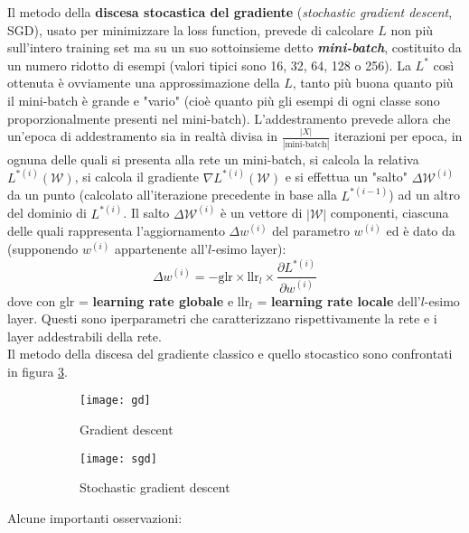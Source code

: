 Il metodo della \textbf{discesa stocastica del gradiente} (\textit{stochastic gradient descent}, SGD), usato per minimizzare la loss function, prevede di calcolare $L$ non più sull'intero training set ma su un suo sottoinsieme detto \textbf{\textit{mini-batch}}, costituito da un numero ridotto di esempi (valori tipici sono 16, 32, 64, 128 o 256). La $L^{*}$ così ottenuta è ovviamente una approssimazione della $L$, tanto più buona quanto più il mini-batch è grande e "vario" (cioè quanto più gli esempi di ogni classe sono proporzionalmente presenti nel mini-batch). L'addestramento prevede allora che un'epoca di addestramento sia in realtà divisa in $\frac{|X|}{|\text{mini-batch}|}$ iterazioni per epoca, in ognuna delle quali si presenta alla rete un mini-batch, si calcola la relativa $L^{*(i)}(\mathcal{W})$, si calcola il gradiente $\nabla L^{*(i)}(\mathcal{W})$ e si effettua un "salto" $\Delta \mathcal{W}^{(i)}$ da un punto (calcolato all'iterazione precedente in base alla $L^{*(i-1)}$) ad un altro del dominio di $L^{*(i)}$. Il salto $\Delta \mathcal{W}^{(i)}$ è un vettore di $|\mathcal{W}|$ componenti, ciascuna delle quali rappresenta l'aggiornamento $\Delta w^{(i)}$ del parametro $w^{(i)}$ ed è dato da (supponendo $w^{(i)}$ appartenente all'$l$-esimo layer):
\[
\Delta w^{(i)}=-\text{glr}\times \text{llr}_l\times \frac{\partial L^{*(i)}}{\partial w^{(i)}}
\]
dove con glr = \textbf{learning rate globale} e $\text{llr}_l$ = \textbf{learning rate locale} dell'$l$-esimo layer. Questi sono iperparametri che caratterizzano rispettivamente la rete e i layer addestrabili della rete.\\

Il metodo della discesa del gradiente classico e quello stocastico sono confrontati in figura \ref{fig:gdConfronto}.

\begin{figure}[h!]
\centering
\begin{subfigure}[b]{0.48\textwidth}
\texttt{[image: gd]}
\caption{Gradient descent}
\label{fig:gd}
\end{subfigure}
\begin{subfigure}[b]{0.48\textwidth}
\texttt{[image: sgd]}
\caption{Stochastic gradient descent}
\label{fig:sgd}
\end{subfigure}
\caption{}
\label{fig:gdConfronto}
\end{figure}

\noindent Alcune importanti osservazioni:

